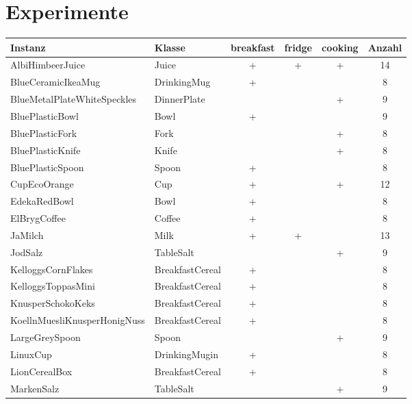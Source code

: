 \graphicspath{{./images/}}      
\def\CHAPTERONE{./chapters/Chapter-1} 

\chapter{Experimente}
\label{chap:experiments}
%	


\begin{table}
\begin{tabularx}{\textwidth}{llcccc}
\textbf{Instanz}  				& \textbf{Klasse}	& \textbf{breakfast}	& \textbf{fridge}	& \textbf{cooking}	& \textbf{Anzahl} \\ \hline
AlbiHimbeerJuice				& Juice				& +			& +			& +			& 14	\\
BlueCeramicIkeaMug				& DrinkingMug		& +			& 			&			& 8	\\
BlueMetalPlateWhiteSpeckles		& DinnerPlate		& 			& 			&	+		& 9	\\
BluePlasticBowl					& Bowl				& +			& 			&			& 9	\\
BluePlasticFork					& Fork				& 			& 			&	+		& 8	\\
BluePlasticKnife				& Knife				& 			& 			&	+		& 8	\\
BluePlasticSpoon				& Spoon				& +			& 			&			& 8	\\
CupEcoOrange					& Cup				& +			& 			&	+		& 12	\\
EdekaRedBowl					& Bowl				& +			& 			&			& 8	\\
ElBrygCoffee					& Coffee			& +			& 			&			& 8	\\
JaMilch							& Milk				& +			& +			&			& 13	\\
JodSalz							& TableSalt			& 			& 			&	+		& 9	\\
KelloggsCornFlakes				& BreakfastCereal	& +			& 			&			& 8	\\
KelloggsToppasMini				& BreakfastCereal	& +			& 			&			& 8	\\
KnusperSchokoKeks				& BreakfastCereal	& +			& 			&			& 8	\\
KoellnMuesliKnusperHonigNuss	& BreakfastCereal	& +			& 			&			& 8	\\
LargeGreySpoon					& Spoon				& 			& 			&	+		& 9	\\
LinuxCup						& DrinkingMugin		& +			& 			&			& 8	\\
LionCerealBox					& BreakfastCereal	& +			& 			&			& 8	\\
MarkenSalz						& TableSalt			& 			& 			&	+		& 9	\\

\end{tabularx}
\end{table}
